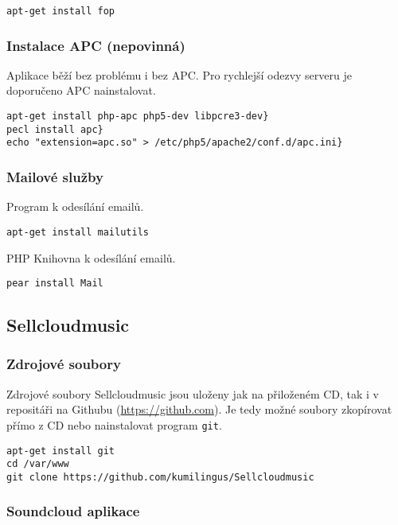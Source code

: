 \documentclass[12pt]{article}
\begin{document}
\begin{lstlisting}
apt-get install fop
\end{lstlisting}

\subsubsection{Instalace APC (nepovinná)}\label{apc}

Aplikace běží bez problému i bez APC. Pro rychlejší odezvy serveru je doporučeno APC nainstalovat.

\begin{lstlisting}
apt-get install php-apc php5-dev libpcre3-dev}
pecl install apc}
echo "extension=apc.so" > /etc/php5/apache2/conf.d/apc.ini}
\end{lstlisting}

\subsubsection{Mailové služby}

Program k odesílání emailů.

\begin{lstlisting}
apt-get install mailutils
\end{lstlisting}

PHP Knihovna k odesílání emailů.

\begin{lstlisting}
pear install Mail
\end{lstlisting}

\subsection{Sellcloudmusic}

\subsubsection{Zdrojové soubory}

Zdrojové soubory Sellcloudmusic jsou uloženy jak na přiloženém CD, tak i v repositáři na Githubu (\url{https://github.com}). Je tedy možné soubory zkopírovat přímo z CD nebo nainstalovat program \texttt{git}.\newline

\begin{lstlisting}
apt-get install git
cd /var/www
git clone https://github.com/kumilingus/Sellcloudmusic
\end{lstlisting}

\subsubsection{Soundcloud aplikace} \label{scapp}
\end{document}
